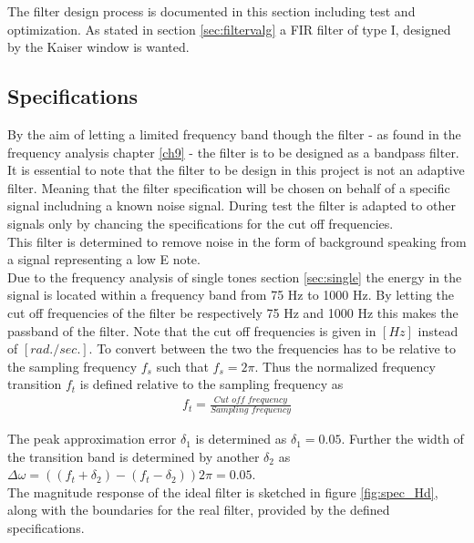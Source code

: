 The filter design process is documented in this section including test and optimization. As stated in section \ref{sec:filtervalg} a FIR filter of type I, designed by the Kaiser window is wanted.
\subsection{Specifications}\label{sec:FIRspec} 
By the aim of letting a limited frequency band though the filter - as found in the frequency analysis chapter \ref{ch9} - the filter is to be designed as a bandpass filter. It is essential to note that the filter to be design in this project is not an adaptive filter. Meaning that the filter specification will be chosen on behalf of a specific signal includning a known noise signal. During test the filter is adapted to other signals only by chancing the specifications for the cut off frequencies.\\
This filter is determined to remove noise in the form of background speaking from a signal representing a low E note. \\
Due to the frequency analysis of single tones section \ref{sec:single} the energy in the signal is located within a frequency band from 75 Hz to 1000 Hz.  
By letting the cut off frequencies of the filter be respectively 75 Hz and 1000 Hz this makes the passband of the filter. Note that the cut off frequencies is given in $[Hz]$ instead of $[rad./sec.]$. To convert between the two the frequencies has to be relative to the sampling frequency $f_s$ such that $f_s = 2\pi$. Thus the normalized frequency transition $f_t$ is defined relative to the sampling frequency as
\begin{align}
f_t = \frac{\textit{Cut off frequency}}{\textit{Sampling frequency}}
\end{align}

The peak approximation error $\delta_1$ is determined as $\delta_1=0.05$. Further the width of the transition band is determined by another $\delta_2$ as $\Delta \omega = ((f_t + \delta_2)-(f_t - \delta_2))2\pi= 0.05$.\\
The magnitude response of the ideal filter is sketched in figure \ref{fig:spec_Hd}, along with the boundaries for the real filter, provided by the defined specifications.      

